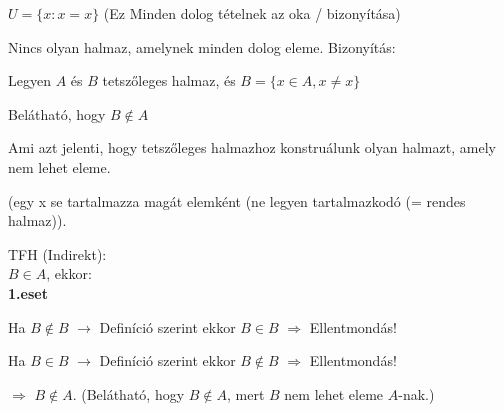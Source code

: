 \begin{frame}
  \begin{tcolorbox}[title={Russel-paradoxon}]
    $U = \{x : x = x \}$ (Ez Minden dolog tételnek az oka / bizonyítása)
  \end{tcolorbox}

  \begin{tcolorbox}[title={Tétel: Minden dolog halmaza}]
    Nincs olyan halmaz, amelynek minden dolog eleme.
  \tcblower
    Bizonyítás:\\
    \mmedskip

    Legyen $A$ és $B$ tetszőleges halmaz, és $B = \{x \in A, x \neq x \}$
    \msmallskip
    
    Belátható, hogy $B \notin A$
    \msmallskip
    
    Ami azt jelenti, hogy tetszőleges halmazhoz konstruálunk olyan halmazt, amely nem lehet eleme.\\
    \mtinyskip
    
    (egy x se tartalmazza magát elemként (ne legyen tartalmazkodó (= rendes halmaz)).\\
    \mmedskip

    TFH (Indirekt):\\
    $B \in A$, ekkor:\\

    \textbf{1.eset}\\
    \msmallskip

    Ha $B \notin B$ $\rightarrow$ Definíció szerint ekkor $B \in B$ $\Rightarrow$ Ellentmondás!\\
    \msmallskip

    Ha $B \in B$ $\rightarrow$ Definíció szerint ekkor $B \notin B$ $\Rightarrow$ Ellentmondás!\\
    \msmallskip

    $\Rightarrow$ $B \notin A$.
    (Belátható, hogy $B \notin A$, mert $B$ nem lehet eleme $A$-nak.)
  \end{tcolorbox}
\end{frame}

